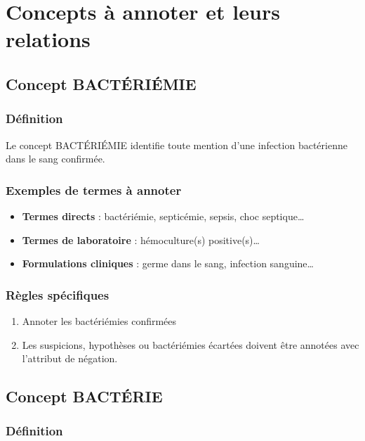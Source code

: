 \chapter{Concepts à annoter et leurs relations}

\section{Concept BACTÉRIÉMIE}

\subsection{Définition}

Le concept BACTÉRIÉMIE identifie toute mention d'une infection bactérienne dans le sang confirmée.

\subsection{Exemples de termes à annoter}

\begin{itemize}
    \item \textbf{Termes directs} : bactériémie, septicémie, sepsis, choc septique\ldots
    \item \textbf{Termes de laboratoire} : hémoculture(s) positive(s)\ldots
    \item \textbf{Formulations cliniques} : germe dans le sang, infection sanguine\ldots
\end{itemize}

\subsection{Règles spécifiques}

\begin{enumerate}
    \item Annoter les bactériémies confirmées
    \item Les suspicions, hypothèses ou bactériémies écartées doivent être annotées avec l'attribut de négation.
\end{enumerate}

\section{Concept BACTÉRIE}

\subsection{Définition}

